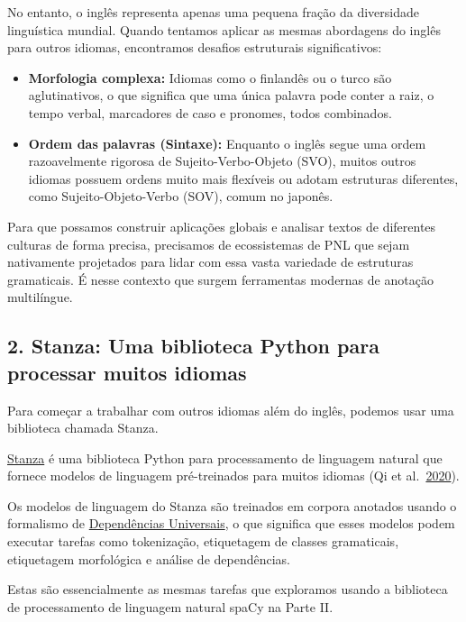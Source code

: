\documentclass[
  brazilian,
]{article}
\providecommand{\tightlist}{%
  \setlength{\itemsep}{0pt}\setlength{\parskip}{0pt}}
\begin{document}
No entanto, o inglês representa apenas uma pequena fração da diversidade
linguística mundial. Quando tentamos aplicar as mesmas abordagens do
inglês para outros idiomas, encontramos desafios estruturais
significativos:

\begin{itemize}
\tightlist
\item
  \textbf{Morfologia complexa:} Idiomas como o finlandês ou o turco são
  aglutinativos, o que significa que uma única palavra pode conter a
  raiz, o tempo verbal, marcadores de caso e pronomes, todos combinados.
\item
  \textbf{Ordem das palavras (Sintaxe):} Enquanto o inglês segue uma
  ordem razoavelmente rigorosa de Sujeito-Verbo-Objeto (SVO), muitos
  outros idiomas possuem ordens muito mais flexíveis ou adotam
  estruturas diferentes, como Sujeito-Objeto-Verbo (SOV), comum no
  japonês.
\end{itemize}

Para que possamos construir aplicações globais e analisar textos de
diferentes culturas de forma precisa, precisamos de ecossistemas de PNL
que sejam nativamente projetados para lidar com essa vasta variedade de
estruturas gramaticais. É nesse contexto que surgem ferramentas modernas
de anotação multilíngue.

\hypertarget{stanza-uma-biblioteca-python-para-processar-muitos-idiomas}{%
\subsection{2. Stanza: Uma biblioteca Python para processar muitos
idiomas}\label{stanza-uma-biblioteca-python-para-processar-muitos-idiomas}}

Para começar a trabalhar com outros idiomas além do inglês, podemos usar
uma biblioteca chamada Stanza.

\href{https://stanfordnlp.github.io/stanza/}{Stanza} é uma biblioteca
Python para processamento de linguagem natural que fornece modelos de
linguagem pré-treinados para muitos idiomas (Qi et
al.~\href{https://www.aclweb.org/anthology/2020.acl-demos.14/}{2020}).

Os modelos de linguagem do Stanza são treinados em corpora anotados
usando o formalismo de
\href{https://universaldependencies.org/}{Dependências Universais}, o
que significa que esses modelos podem executar tarefas como tokenização,
etiquetagem de classes gramaticais, etiquetagem morfológica e análise de
dependências.

Estas são essencialmente as mesmas tarefas que exploramos usando a
biblioteca de processamento de linguagem natural spaCy na Parte II.
\end{document}
